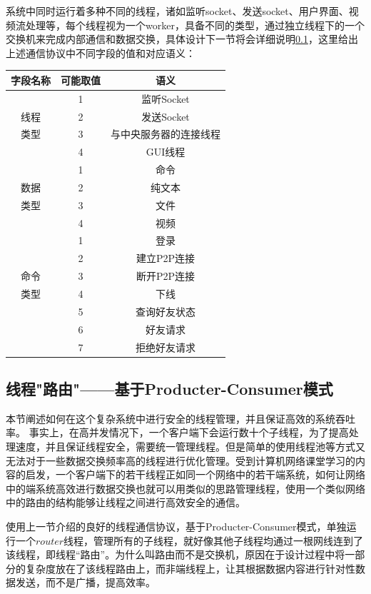 \documentclass[UTF8]{ctexart}
\begin{document}
系统中同时运行着多种不同的线程，诸如监听socket、发送socket、用户界面、视频流处理等，每个线程视为一个worker，具备不同的类型，通过独立线程下的一个交换机来完成内部通信和数据交换，具体设计下一节将会详细说明\ref{router}，这里给出上述通信协议中不同字段的值和对应语义：
\begin{table}[H]
    \centering
    \begin{tabular}{ccc}
        \hline
        字段名称 & 可能取值 & 语义\\
        \hline
        & 1 & 监听Socket\\
        线程&2&发送Socket\\
        类型&3&与中央服务器的连接线程\\
        &4&GUI线程\\
        \hline
        &1&命令\\
        数据&2&纯文本\\
        类型&3&文件\\
        &4&视频\\
        \hline
        &1&登录\\
        &2&建立P2P连接\\
        命令&3&断开P2P连接\\
        类型&4&下线\\
        &5&查询好友状态\\
        &6&好友请求\\
        &7&拒绝好友请求\\
        \hline
    \end{tabular}
\end{table}

\subsection{线程"路由"——基于Producter-Consumer模式}\label{router}
本节阐述如何在这个复杂系统中进行安全的线程管理，并且保证高效的系统吞吐率。
事实上，在高并发情况下，一个客户端下会运行数十个子线程，为了提高处理速度，并且保证线程安全，需要统一管理线程。但是简单的使用线程池等方式又无法对于一些数据交换频率高的线程进行优化管理。受到计算机网络课堂学习的内容的启发，一个客户端下的若干线程正如同一个网络中的若干端系统，如何让网络中的端系统高效进行数据交换也就可以用类似的思路管理线程，使用一个类似网络中的路由的结构能够让线程之间进行高效安全的通信。

使用上一节介绍的良好的线程通信协议，基于Producter-Consumer模式，单独运行一个$router$线程，管理所有的子线程，就好像其他子线程均通过一根网线连到了该线程，即线程“路由”。为什么叫路由而不是交换机，原因在于设计过程中将一部分的复杂度放在了该线程路由上，而非端线程上，让其根据数据内容进行针对性数据发送，而不是广播，提高效率。
\end{document}
